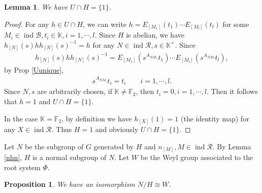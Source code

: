 \documentclass[12pt]{amsart}
\newtheorem{lemma}[theorem]{Lemma}
\newtheorem{proposition}[theorem]{Proposition}
\begin{document}
\begin{lemma}
    We have $U\cap H = \{1\}$.
\end{lemma}

\begin{proof}
    For any $ h \in U \cap H$, we can write $h=E_{[M_1]}(t_1)\cdots E_{[M_l]}(t_l)$ for some $M_i\in \operatorname{ind}\mathcal{B},t_i \in \mathbb{K}, i=1,\cdots ,l$.
    Since $H$ is abelian, we have $h_{[N]}(s) h h_{[N]}(s)^{-1} = h$ for any $ N\in \operatorname{ind}\mathcal{R}, s \in \mathbb{K}^{\times}$. Since
    \begin{align*}
        h_{[N]}(s) h h_{[N]}(s)^{-1} = E_{[M_1]}(s^{A_{NM_1}}t_1) \cdots E_{[M_l]}(s^{A_{NM_l}}t_l),
    \end{align*} 
    by Prop \ref{Uunique}, 
    \begin{align*}
        s^{A_{NM_i}}t_i = t_i \qquad  i=1,\cdots ,l.
    \end{align*}
    Since $N,s$ are arbitrarily chosen, 
    if $\mathbb{K} \neq \mathbb{F}_2 $, then $t_i = 0 ,  i=1,\cdots , l$. 
    Then it follows that $h=1$ and   $U\cap H = \{1\}$.

    In the case $\mathbb{K}=\mathbb{F}_2$, by definition we have $h_{[X]}(1)=1$ (the identity map) for any $ X \in \operatorname{ind}\mathcal{R}$. 
    Thus $H=1$ and obviously   $U\cap H = \{1\}$.
\end{proof}

Let $N$ be the subgroup of $G$ generated by $H$ and $n_{[M]}, M \in \operatorname{ind}\mathcal{R}$.
By Lemma \ref{nhn}, $H$ is a normal subgroup of $N$.
Let $W$ be the Weyl group associated to the root system $\Phi$. 

\begin{proposition}
    We have an isomorphism $N/H \cong W$.
\end{proposition}
\end{document}
